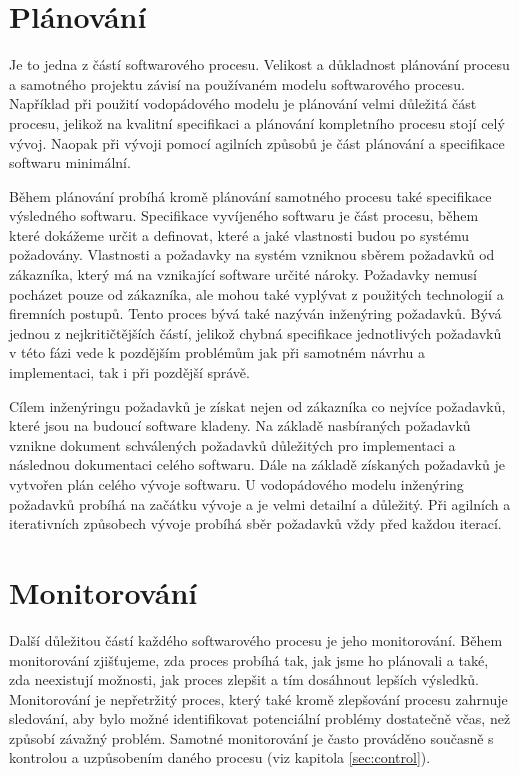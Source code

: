\documentclass[czech,master]{diploma}
\begin{document}
\section{Plánování}
Je to jedna z částí softwarového procesu. Velikost a důkladnost plánování procesu a samotného projektu závisí na používaném modelu softwarového procesu. Například při použití vodopádového modelu je plánování velmi důležitá část procesu, jelikož na kvalitní specifikaci a plánování kompletního procesu stojí celý vývoj. Naopak při vývoji pomocí agilních způsobů je část plánování a specifikace softwaru minimální.

Během plánování probíhá kromě plánování samotného procesu také specifikace výsledného softwaru. Specifikace vyvíjeného softwaru je část procesu, během které dokážeme určit a definovat, které a jaké vlastnosti budou po systému požadovány. Vlastnosti a požadavky na systém vzniknou sběrem požadavků od zákazníka, který má na vznikající software určité nároky. Požadavky nemusí pocházet pouze od zákazníka, ale mohou také vyplývat z použitých technologií a firemních postupů. Tento proces bývá také nazýván inženýring požadavků. Bývá jednou z nejkritičtějších částí, jelikož chybná specifikace jednotlivých požadavků v této fázi vede k pozdějším problémům jak při samotném návrhu a implementaci, tak i při pozdější správě.

Cílem inženýringu požadavků je získat nejen od zákazníka co nejvíce požadavků, které jsou na budoucí software kladeny. Na základě nasbíraných požadavků vznikne dokument schválených požadavků důležitých pro implementaci a následnou dokumentaci celého softwaru. Dále na základě získaných požadavků je vytvořen plán celého vývoje softwaru. U vodopádového modelu inženýring požadavků probíhá na začátku vývoje a je velmi detailní a důležitý. Při agilních a iterativních způsobech vývoje probíhá sběr požadavků vždy před každou iterací.

\section{Monitorování}
Další důležitou částí každého softwarového procesu je jeho monitorování. Během monitorování zjišťujeme, zda proces probíhá tak, jak jsme ho plánovali a také, zda neexistují možnosti, jak proces zlepšit a tím dosáhnout lepších výsledků. Monitorování je nepřetržitý proces, který také kromě zlepšování procesu zahrnuje sledování, aby bylo možné identifikovat potenciální problémy dostatečně včas, než způsobí závažný problém. Samotné monitorování je často prováděno současně s kontrolou a uzpůsobením daného procesu (viz kapitola \ref{sec:control}).
\end{document}
